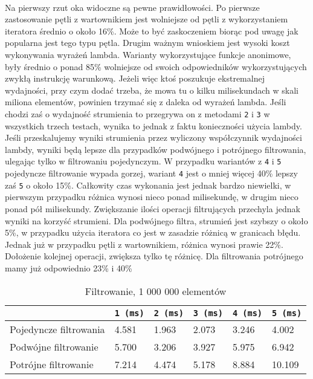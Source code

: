 \documentclass[a4paper,10pt]{report}
\begin{document}
\paragraph{}
Na pierwszy rzut oka widoczne są pewne prawidłowości. Po pierwsze zastosowanie pętli z wartownikiem jest wolniejsze od pętli z wykorzystaniem iteratora średnio o około 16\%. Może to być zaskoczeniem biorąc pod uwagę jak popularna jest tego typu pętla. Drugim ważnym wnioskiem jest wysoki koszt wykonywania wyrażeń lambda. Warianty wykorzystujące funkcje anonimowe, były średnio o ponad 85\% wolniejsze od swoich odpowiedników wykorzystujących zwykłą instrukcję warunkową. Jeżeli więc ktoś poszukuje ekstremalnej wydajności, przy czym dodać trzeba, że mowa tu o kilku milisekundach w skali miliona elementów, powinien trzymać się z daleka od wyrażeń lambda. Jeśli chodzi zaś o wydajność strumienia to przegrywa on z metodami \verb|2| i \verb|3| w wszystkich trzech testach, wynika to jednak z faktu konieczności użycia lambdy. Jeśli przeskalujemy wyniki strumienia przez wyliczony współczynnik wydajności lambdy, wyniki będą lepsze dla przypadków podwójnego i potrójnego filtrowania, ulegając tylko w filtrowaniu pojedynczym. W przypadku wariantów z \verb|4| i \verb|5| pojedyncze filtrowanie wypada gorzej, wariant \verb|4| jest o mniej więcej 40\% lepszy zaś \verb|5| o około 15\%. Całkowity czas wykonania jest jednak bardzo niewielki, w pierwszym przypadku różnica wynosi nieco ponad milisekundę, w drugim nieco ponad pół milisekundy. Zwiększanie ilości operacji filtrujących przechyla jednak wyniki na korzyść strumieni. Dla podwójnego filtra, strumień jest szybszy o około 5\%, w przypadku użycia iteratora co jest w zasadzie różnicą w granicach błędu. Jednak już w przypadku pętli z wartownikiem, różnica wynosi prawie 22\%. Dołożenie kolejnej operacji, zwiększa tylko tę różnicę. Dla filtrowania potrójnego mamy już odpowiednio 23\% i 40\%
\begin{table}[t]
	\caption{Filtrowanie, 1 000 000 elementów}
	\label{tab1}
\begin{tabular}{|l|l|l|l|l|l|}
	\hline 
	& \verb|1 (ms)| & \verb|2 (ms)| & \verb|3 (ms)| & \verb|4 (ms)| & \verb|5 (ms)|\\
	\hline
	Pojedyncze filtrowania & 4.581 & 1.963 & 2.073 & 3.246 & 4.002 \\
	\hline
	Podwójne filtrowanie & 5.700 & 3.206 & 3.927 & 5.975 & 6.942 \\
	\hline
	Potrójne filtrowanie & 7.214 & 4.474 & 5.178 & 8.884 & 10.109 \\
	\hline
\end{tabular} 
\end{table}
\end{document}
